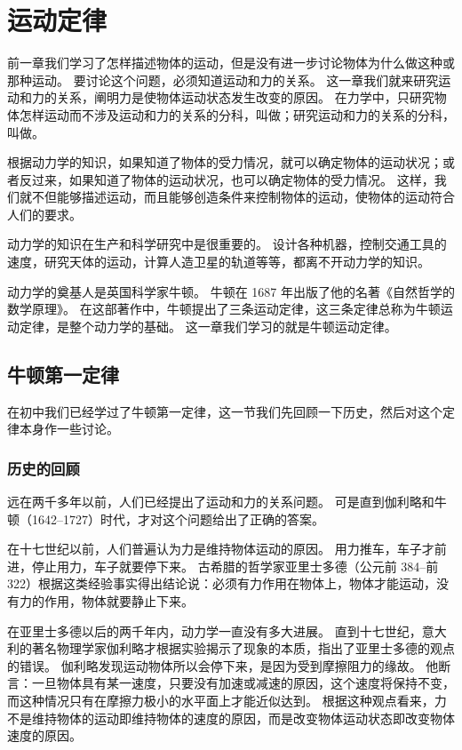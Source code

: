 \chapter{运动定律}\label{chp:movement_law}

前一章我们学习了怎样描述物体的运动，但是没有进一步讨论物体为什么做这种或那种运动。
要讨论这个问题，必须知道运动和力的关系。
这一章我们就来研究运动和力的关系，阐明力是使物体运动状态发生改变的原因。
在力学中，只研究物体怎样运动而不涉及运动和力的关系的分科，叫做；研究运动和力的关系的分科，叫做。

根据动力学的知识，如果知道了物体的受力情况，就可以确定物体的运动状况；或者反过来，如果知道了物体的运动状况，也可以确定物体的受力情况。
这样，我们就不但能够描述运动，而且能够创造条件来控制物体的运动，使物体的运动符合人们的要求。

动力学的知识在生产和科学研究中是很重要的。
设计各种机器，控制交通工具的速度，研究天体的运动，计算人造卫星的轨道等等，都离不开动力学的知识。

动力学的奠基人是英国科学家牛顿。
牛顿在 1687 年出版了他的名著《自然哲学的数学原理》。
在这部著作中，牛顿提出了三条运动定律，这三条定律总称为牛顿运动定律，是整个动力学的基础。
这一章我们学习的就是牛顿运动定律。

\section{牛顿第一定律}
在初中我们已经学过了牛顿第一定律，这一节我们先回顾一下历史，然后对这个定律本身作一些讨论。

\subsection{历史的回顾} 
远在两千多年以前，人们已经提出了运动和力的关系问题。
可是直到伽利略和牛顿（1642--1727）时代，才对这个问题给出了正确的答案。

在十七世纪以前，人们普遍认为力是维持物体运动的原因。
用力推车，车子才前进，停止用力，车子就要停下来。
古希腊的哲学家亚里士多德（公元前 384--前 322）根据这类经验事实得出结论说：必须有力作用在物体上，物体才能运动，没有力的作用，物体就要静止下来。

在亚里士多德以后的两千年内，动力学一直没有多大进展。
直到十七世纪，意大利的著名物理学家伽利略才根据实验揭示了现象的本质，指出了亚里士多德的观点的错误。
伽利略发现运动物体所以会停下来，是因为受到摩擦阻力的缘故。
他断言：一旦物体具有某一速度，只要没有加速或减速的原因，这个速度将保持不变，而这种情况只有在摩擦力极小的水平面上才能近似达到。
根据这种观点看来，力不是维持物体的运动即维持物体的速度的原因，而是改变物体运动状态即改变物体速度的原因。

